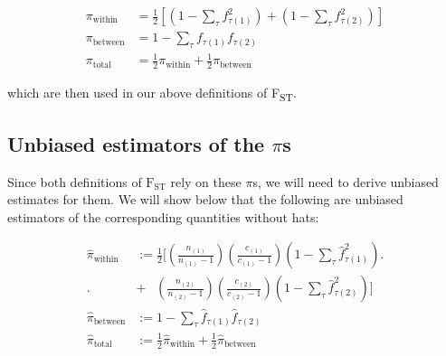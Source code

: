 \documentclass[a4paper,fontsize=9pt,DIV=14]{scrartcl}
\newcommand{\coverage}{c}
\newcommand{\empfreq}{\widehat{f}}
\newcommand{\fst}{F\textsubscript{ST}}
\begin{document}
\begin{align}
    \label{eq:PiDefs:PiWithin}
    \pi_\text{within} &= \frac{1}{2}\left[\left(1 - \sum_\tau f_{\tau(1)}^2\right) + \left(1 - \sum_\tau f_{\tau(2)}^2\right)\right] \\
    \label{eq:PiDefs:PiBetween}
    \pi_\text{between} &= 1 - \sum_\tau f_{\tau(1)}f_{\tau(2)} \\
    \label{eq:PiDefs:PiTotal}
    \pi_\text{total} &= \frac{1}{2}\pi_\text{within} + \frac{1}{2}\pi_\text{between}
\end{align}

which are then used in our above definitions of \fst.


\subsection{Unbiased estimators of the \texorpdfstring{$\pi$s}{pi's}}
\label{supp:sec:FST:sub:EstimatorsPi}

Since both definitions of $\text{F}_\text{ST}$ rely on these $\pi$s, we will need to derive unbiased estimates for them.
We will show below that the following are unbiased estimators of the corresponding quantities without hats:

\begin{align}
    \nonumber
    \widehat{\pi}_\text{within} &:=
        \frac{1}{2}
        \Bigg[                                 \left( \frac{n_{(1)}}{n_{(1)}-1} \right) \left( \frac{\coverage_{(1)}}{\coverage_{(1)}-1} \right) \left( 1 - \sum_{\tau} \empfreq_{\tau(1)}^2 \right) \Bigg. \\
        \Bigg. &+ \phantom{\frac{1}{2} \Bigg[} \left( \frac{n_{(2)}}{n_{(2)}-1} \right) \left( \frac{\coverage_{(2)}}{\coverage_{(2)}-1} \right) \left( 1 - \sum_{\tau} \empfreq_{\tau(2)}^2 \right) \Bigg] \\
    \widehat{\pi}_\text{between} &:=
        1 - \sum_{\tau} \empfreq_{\tau(1)}\empfreq_{\tau(2)} \\
    \widehat{\pi}_\text{total} &:=
        \frac{1}{2}\widehat{\pi}_\text{within} + \frac{1}{2}\widehat{\pi}_\text{between}
\end{align}
\end{document}
